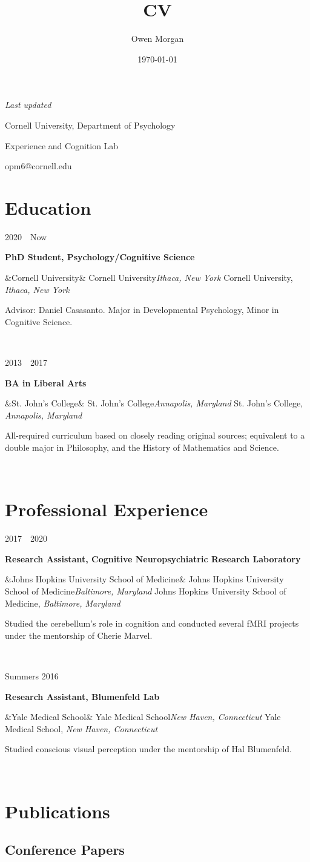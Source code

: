 \documentclass{article}
\author{Owen Morgan}
\title{CV}
\date{\today}
\makeatletter
\newcommand{\entry}[5]{

  \begin{minipage}[t]{.15\textwidth}
    \begin{flushright}
      \hfill {#1}
    \end{flushright}
  \end{minipage}
  \hfill\vline\hfill
  \begin{minipage}[t]{.80\textwidth}
    \textbf{#2}

    \ifx&#3&
      {#3}\textit{#4}
    \else
      {#3, }\textit{#4}

    \fi
    \footnotesize{#5}
  \end{minipage}\\\vspace{.25cm}
}
\newcommand{\cu}{Cornell University}
\newcommand{\sjc}{St. John's College}
\newcommand{\jhusom}{Johns Hopkins University School of Medicine}
\renewcommand{\maketitle}{
  \begin{minipage}[t]{.5\textwidth}
    \begin{flushleft}
      \textit{Last updated \thedate}
    \end{flushleft}
  \end{minipage}
  \begin{minipage}[t]{.5\textwidth}
    \begin{flushright}
      {\huge\bfseries
      \theauthor}

      \vspace{.25em}

      \cu, Department of Psychology

      Experience and Cognition Lab

      opm6@cornell.edu

    \end{flushright}
  \end{minipage}
}
\makeatother
\begin{document}
\maketitle

\section{Education}

\entry
{2020~\textendash~Now}
{PhD Student, Psychology/Cognitive Science}
{\cu}{Ithaca, New York}
{Advisor: Daniel Casasanto. Major in Developmental Psychology, Minor in Cognitive Science.}

\entry
{2013~\textendash~2017}
{BA in Liberal Arts}
{\sjc}{Annapolis, Maryland}
{All-required curriculum based on closely reading original sources; equivalent to a double major in Philosophy, and the History of Mathematics and Science.}

\section{Professional Experience}

\entry
{2017~\textendash~2020}
{Research Assistant, Cognitive Neuropsychiatric Research Laboratory}
{\jhusom}{Baltimore, Maryland}
{Studied the cerebellum’s role in cognition and conducted several fMRI projects under the mentorship of Cherie Marvel.}

\entry
{Summers 2016 }
{Research Assistant, Blumenfeld Lab}
{Yale Medical School}{New Haven, Connecticut}
{Studied conscious visual perception under the mentorship of Hal Blumenfeld.}

\section{Publications}



\subsection{Conference Papers}
\nocite{*}
\printbibliography[heading=none]
\end{document}
